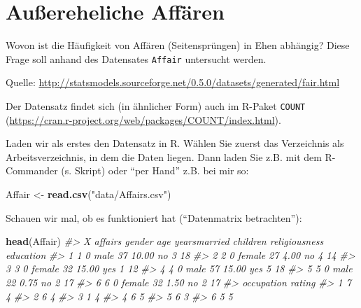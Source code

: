 \documentclass[12pt,ngerman,]{book}
\newenvironment{Shaded}{\begin{snugshade}}{\end{snugshade}}
\newcommand{\KeywordTok}[1]{\textcolor[rgb]{0.13,0.29,0.53}{\textbf{{#1}}}}
\newcommand{\StringTok}[1]{\textcolor[rgb]{0.31,0.60,0.02}{{#1}}}
\newcommand{\CommentTok}[1]{\textcolor[rgb]{0.56,0.35,0.01}{\textit{{#1}}}}
\newcommand{\NormalTok}[1]{{#1}}
\renewenvironment{Shaded}{\begin{kframe}}{\end{kframe}}
\begin{document}
\section{Außereheliche Affären}\label{auereheliche-affaren}

Wovon ist die Häufigkeit von Affären (Seitensprüngen) in Ehen abhängig?
Diese Frage soll anhand des Datensates \texttt{Affair} untersucht
werden.

Quelle:
\url{http://statsmodels.sourceforge.net/0.5.0/datasets/generated/fair.html}

Der Datensatz findet sich (in ähnlicher Form) auch im R-Paket
\texttt{COUNT}
(\url{https://cran.r-project.org/web/packages/COUNT/index.html}).

Laden wir als erstes den Datensatz in R. Wählen Sie zuerst das
Verzeichnis als Arbeitsverzeichnis, in dem die Daten liegen. Dann laden
Sie z.B. mit dem R-Commander (s. Skript) oder ``per Hand'' z.B. bei mir
so:

\begin{Shaded}
\begin{Highlighting}[]
\NormalTok{Affair <-}\StringTok{ }\KeywordTok{read.csv}\NormalTok{(}\StringTok{"data/Affairs.csv"}\NormalTok{)}
\end{Highlighting}
\end{Shaded}

Schauen wir mal, ob es funktioniert hat (``Datenmatrix betrachten''):

\begin{Shaded}
\begin{Highlighting}[]
\KeywordTok{head}\NormalTok{(Affair)}
\CommentTok{#>   X affairs gender age yearsmarried children religiousness education}
\CommentTok{#> 1 1       0   male  37        10.00       no             3        18}
\CommentTok{#> 2 2       0 female  27         4.00       no             4        14}
\CommentTok{#> 3 3       0 female  32        15.00      yes             1        12}
\CommentTok{#> 4 4       0   male  57        15.00      yes             5        18}
\CommentTok{#> 5 5       0   male  22         0.75       no             2        17}
\CommentTok{#> 6 6       0 female  32         1.50       no             2        17}
\CommentTok{#>   occupation rating}
\CommentTok{#> 1          7      4}
\CommentTok{#> 2          6      4}
\CommentTok{#> 3          1      4}
\CommentTok{#> 4          6      5}
\CommentTok{#> 5          6      3}
\CommentTok{#> 6          5      5}
\end{Highlighting}
\end{Shaded}
\end{document}
